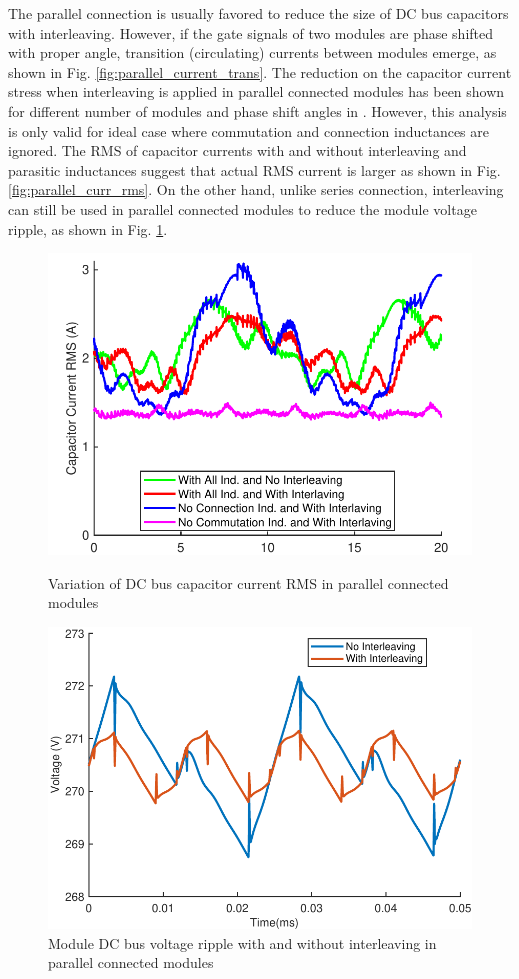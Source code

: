 The parallel connection is usually favored to reduce the size of DC bus capacitors with interleaving. However, if the gate signals of two modules are phase shifted with proper angle, transition (circulating) currents between modules emerge, as shown in Fig. \ref{fig:parallel_current_trans}. The reduction on the capacitor current stress when interleaving is applied in parallel connected modules has been shown for different number of modules and phase shift angles in \cite{Ugur2017}. However, this analysis is only valid for ideal case where commutation and connection inductances are ignored. The RMS of capacitor currents with and without interleaving and parasitic inductances suggest that actual RMS current is larger as shown in Fig. \ref{fig:parallel_curr_rms}. On the other hand, unlike series connection, interleaving can still be used in parallel connected modules to reduce the module voltage ripple, as shown in Fig. \ref{fig:parallel_volt_ripple}.

\begin{figure}[tb]
  \includegraphics[width=\linewidth]{figures/parallel_curr_rms.pdf}
  \caption{Variation of DC bus capacitor current RMS in parallel connected modules}\label{fig:parallel_curr_rms}
\endminipage\hfill
{}
  \includegraphics[width=\linewidth]{figures/parallel_volt_ripple.pdf}
  \caption{Module DC bus voltage ripple with and without interleaving in parallel connected modules }\label{fig:parallel_volt_ripple}
\endminipage
\end{figure}

